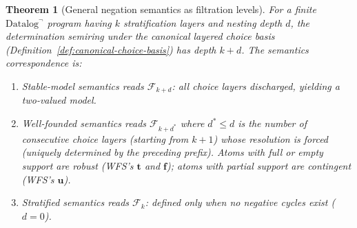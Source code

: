 \documentclass[acmsmall,review,anonymous]{acmart}
\newtheorem{theorem}{Theorem}
\theoremstyle{remark}
\numberwithin{definition}{section}
\numberwithin{theorem}{section}
\numberwithin{lemma}{section}
\numberwithin{corollary}{section}
\numberwithin{remark}{section}
\numberwithin{example}{section}
\numberwithin{observation}{section}
\numberwithin{assumption}{section}
\begin{document}
\begin{theorem}[General negation semantics as filtration levels]
  \label{thm:negation-general}
  For a finite $\mbox{Datalog}^\neg$ program having $k$ stratification
  layers and nesting depth $d$, the determination semiring under the
  canonical layered choice basis
  (Definition~\ref{def:canonical-choice-basis}) has depth $k{+}d$.
  The semantics correspondence is:
  \begin{enumerate}[nosep,label=(\alph*)]
    \item \emph{Stable-model semantics} reads $\mathcal{F}_{k+d}$: all
          choice layers discharged, yielding a two-valued model.
    \item \emph{Well-founded semantics} reads $\mathcal{F}_{k+d^*}$
          where $d^* \le d$ is the number of consecutive choice
          layers (starting from $k{+}1$) whose resolution is forced
          (uniquely determined by the preceding prefix).
          Atoms with full or empty support are robust (WFS's
          $\mathbf{t}$ and $\mathbf{f}$); atoms with partial support
          are contingent (WFS's $\mathbf{u}$).
    \item \emph{Stratified semantics} reads $\mathcal{F}_k$: defined
          only when no negative cycles exist ($d = 0$).
  \end{enumerate}
\end{theorem}
\end{document}
